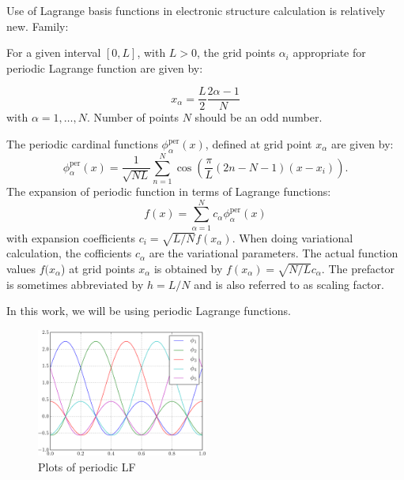 Use of Lagrange basis functions in electronic structure calculation is relatively new.
Family:

For a given interval $[0,L]$, with $L>0$, the grid points $\alpha_{i}$
appropriate for periodic Lagrange function are given by:

\begin{equation}
x_{\alpha}=\frac{L}{2}\frac{2\alpha-1}{N}
\end{equation}
with $\alpha=1,\ldots,N$. Number of points $N$ should be an odd number.

The periodic cardinal functions $\phi_{\alpha}^{\mathrm{per}}(x)$, defined
at grid point $x_{\alpha}$ are given by:
\begin{equation}
\phi_{\alpha}^{\mathrm{per}}(x)=\frac{1}{\sqrt{NL}}\sum_{n=1}^{N}\cos\left(\frac{\pi}{L}(2n-N-1)(x-x_{i})\right).
\label{eq:LF_p_1d}
\end{equation}
The expansion of periodic function in terms of Lagrange functions:
\begin{equation}
f(x)=\sum_{\alpha=1}^{N}c_{\alpha}\phi_{\alpha}^{\mathrm{per}}(x)
\end{equation}
with expansion coefficients $c_{i}=\sqrt{L/N}f(x_{\alpha})$. When doing
variational calculation, the cofficients $c_{\alpha}$ are the variational
parameters. The actual function values $f(x_{\alpha}$) at grid points
$x_{\alpha}$ is obtained by $f(x_{\alpha})=\sqrt{N/L}c_{\alpha}$. The prefactor
is sometimes abbreviated by $h=L/N$ and is also referred to as scaling
factor.

In this work, we will be using periodic Lagrange functions.

\begin{figure}[h]
{\centering
\includegraphics[width=0.5\textwidth]{images/plot_LF_p_N_5.pdf}
\par}
\caption{Plots of periodic LF}
\end{figure}

